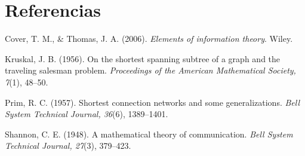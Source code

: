 \documentclass[12pt,a4paper]{article}
\begin{document}
\section*{Referencias}

\begingroup
\setlength{\parindent}{0pt}
\setlength{\parskip}{1em}

Cover, T. M., \& Thomas, J. A. (2006). \textit{Elements of information theory}. Wiley.\par

Kruskal, J. B. (1956). On the shortest spanning subtree of a graph and the traveling salesman problem. \textit{Proceedings of the American Mathematical Society, 7}(1), 48--50.\par

Prim, R. C. (1957). Shortest connection networks and some generalizations. \textit{Bell System Technical Journal, 36}(6), 1389--1401.\par

Shannon, C. E. (1948). A mathematical theory of communication. \textit{Bell System Technical Journal, 27}(3), 379--423.\par

\endgroup
\end{document}
